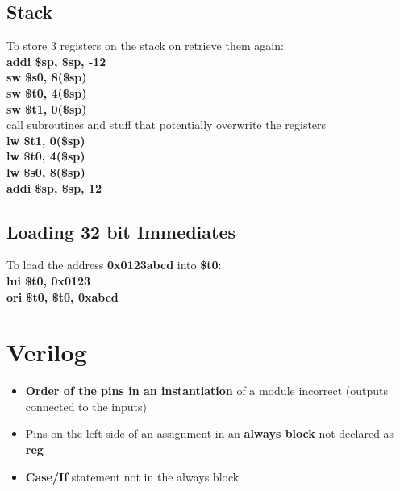 \documentclass[11pt]{article}
\begin{document}
\subsection{Stack}

To store 3 registers on the stack on retrieve them again:\\

\textbf{addi \$sp, \$sp, -12} \\
\textbf{sw \$s0, 8(\$sp)} \\
\textbf{sw \$t0, 4(\$sp)} \\
\textbf{sw \$t1, 0(\$sp)} \\

call subroutines and stuff that potentially overwrite the registers\\

\textbf{lw \$t1, 0(\$sp)} \\
\textbf{lw \$t0, 4(\$sp)} \\
\textbf{lw \$s0, 8(\$sp)} \\
\textbf{addi \$sp, \$sp, 12} \\

\subsection{Loading 32 bit Immediates}

To load the address \textbf{0x0123abcd} into \textbf{\$t0}: \\
\textbf{lui  \$t0, 0x0123} \\
\textbf{ori  \$t0, \$t0, 0xabcd}

\section{Verilog}

\begin{itemize}
	\item \textbf{Order of the pins in an instantiation} of a module incorrect (outputs connected to the inputs)
	\item Pins on the left side of an assignment in an \textbf{always block} not declared as \textbf{reg}
	\item \textbf{Case/If} statement not in the always block
\end{itemize}
	
\end{document}
